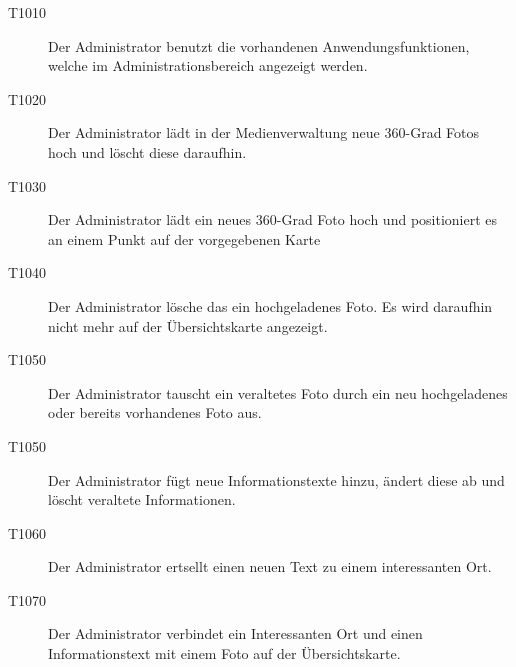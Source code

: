 \begin{description}
  \item[T1010] Der Administrator benutzt die vorhandenen Anwendungsfunktionen, welche im Administrationsbereich angezeigt werden.
  \item[T1020] Der Administrator lädt in der Medienverwaltung neue 360-Grad Fotos hoch und löscht diese daraufhin.
  \item[T1030] Der Administrator lädt ein neues 360-Grad Foto hoch und positioniert es an einem Punkt auf der vorgegebenen Karte
  \item[T1040] Der Administrator lösche das ein hochgeladenes Foto. Es wird daraufhin nicht mehr auf der Übersichtskarte angezeigt.
  \item[T1050] Der Administrator tauscht ein veraltetes Foto durch ein neu hochgeladenes oder bereits vorhandenes Foto aus.
  \item[T1050] Der Administrator fügt neue Informationstexte hinzu, ändert diese ab und löscht veraltete Informationen.
  \item[T1060] Der Administrator ertsellt einen neuen Text zu einem interessanten Ort.
  \item[T1070] Der Administrator verbindet ein Interessanten Ort und einen Informationstext mit einem Foto auf der Übersichtskarte.
\end{description}
